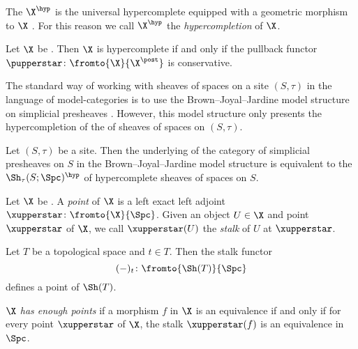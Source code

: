 \begin{nul}
	The \topos $ \X^{\hyp} $ is the universal hypercomplete \topos equipped with a geometric morphism to $ \X $ .
	For this reason we call $ \X^{\hyp} $ the \textit{hypercompletion} of $ \X $.
\end{nul}

\begin{observation}\label{obs:hypercompletecons}
	Let $ \X $ be \atopos.
	Then $ \X $ is hypercomplete if and only if the pullback functor $ \pupperstar \colon \fromto{\X}{\X^{\post}} $ is conservative.
\end{observation}

The standard way of working with sheaves of spaces on a site $ (S,\tau) $ in the language of model-categories is to use the Brown--Joyal--Jardine model structure on simplicial presheaves \cites{MR341469}{MR906403}.
However, this model structure only presents the hypercompletion of the \topos of sheaves of spaces on $ (S,\tau) $.

\begin{proposition}\label{app.prop:HTT.6.5.2.14}
	Let $ (S,\tau) $ be a site.
	Then the underlying \category of the category of simplicial presheaves on $ S $ in the Brown--Joyal--Jardine model structure is equivalent to the \topos $ \Sh_{\tau}(S;\Spc)^{\hyp} $ of hypercomplete sheaves of spaces on $ S $.
\end{proposition}

\begin{definition}
	Let $ \X $ be \atopos.
	A \textit{point} of $ \X $ is a left exact left adjoint $ \xupperstar \colon \fromto{\X}{\Spc} $.
	Given an object $ U \in \X $ and point $ \xupperstar $ of $ \X $, we call $ \xupperstar(U) $ the \textit{stalk} of $ U $ at $ \xupperstar $.
\end{definition}

\begin{example}
	Let $ T $ be a topological space and $ t \in T $. 
	Then the stalk functor
	\begin{equation*}
		(-)_t \colon \fromto{\Sh(T)}{\Spc}
	\end{equation*}
	defines a point of $ \Sh(T) $.
\end{example}

\begin{definition}
	\Atopos $ \X $ \textit{has enough points} if a morphism $ f $ in $ \X $ is an equivalence if and only if for every point $ \xupperstar $ of $ \X $, the stalk $ \xupperstar(f) $ is an equivalence in $ \Spc $.
\end{definition}


